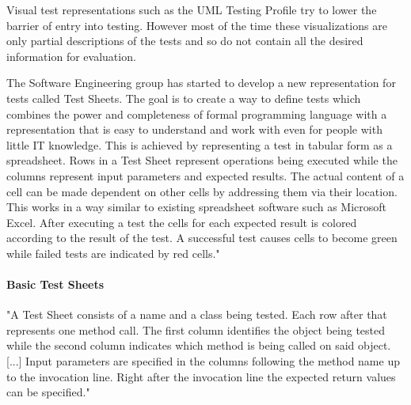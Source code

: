 \documentclass{llncs}
\begin{document}
Visual test representations such as the UML Testing Profile try to lower the barrier of entry into testing.
However most of the time these visualizations are only partial descriptions of the tests and so do not contain all the desired information for evaluation.

The Software Engineering group has started to develop a new representation for tests called Test Sheets.
The goal is to create a way to define tests which combines the power and completeness of formal programming language with a representation that is easy to understand and work with even for people with little IT knowledge.
This is achieved by representing a test in tabular form as a spreadsheet.
Rows in a Test Sheet represent operations being executed while the columns represent input parameters and expected results.
The actual content of a cell can be made dependent on other cells by addressing them via their location.
This works in a way similar to existing spreadsheet software such as Microsoft Excel.
After executing a test the cells for each expected result is colored according to the result of the test.
A successful test causes cells to become green while failed tests are indicated by red cells."\cite{ts}
 \paragraph{Basic Test Sheets}
"A Test Sheet consists of a name and a class being tested. 
Each row after that represents one method call.
The first column identifies the object being tested while the second column indicates which method is being called on said object. [...]
Input parameters are specified in the columns following the method name up to the invocation line. 
Right after the invocation line the expected return values can be specified."\cite{tsb}


\end{document}
